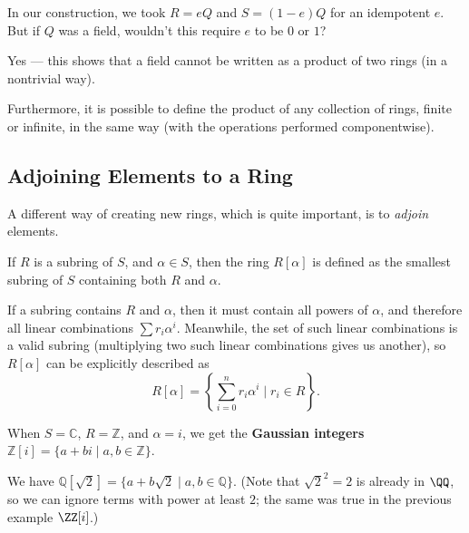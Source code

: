 \begin{question}
In our construction, we took $R = eQ$ and $S = (1 - e)Q$ for an idempotent $e$. But if $Q$ was a field, wouldn't this require $e$ to be $0$ or $1$? 
\end{question}

\begin{ans}
Yes --- this shows that a field cannot be written as a product of two rings (in a nontrivial way). 
\end{ans}

Furthermore, it is possible to define the product of any collection of rings, finite or infinite, in the same way (with the operations performed componentwise). 



\subsection{Adjoining Elements to a Ring}

A different way of creating new rings, which is quite important, is to \emph{adjoin} elements. 

\begin{definition}
    If $R$ is a subring of $S$, and $\alpha \in S$, then the ring $R[\alpha]$ is defined as the smallest subring of $S$ containing both $R$ and $\alpha$. 
\end{definition}

If a subring contains $R$ and $\alpha$, then it must contain all powers of $\alpha$, and therefore all linear combinations $\sum r_i\alpha^i$. Meanwhile, the set of such linear combinations is a valid subring (multiplying two such linear combinations gives us another), so $R[\alpha]$ can be explicitly described as \[R[\alpha] = \left\{\sum_{i = 0}^n r_i\alpha^i \mid r_i \in R\right\}.\] 

\begin{example}
    When $S = \mathbb{C}$, $R = \mathbb{Z}$, and $\alpha = i$, we get the \textbf{Gaussian integers} $\mathbb{Z}[i] = \{a + bi \mid a, b \in \mathbb{Z}\}$. 
\end{example}

\begin{example}
    We have $\mathbb{Q}[\sqrt{2}] = \{a + b\sqrt{2} \mid a, b \in \mathbb{Q}\}$. (Note that $\sqrt{2}^2 = 2$ is already in $\QQ$, so we can ignore terms with power at least $2$; the same was true in the previous example $\ZZ[i]$.)
\end{example}

